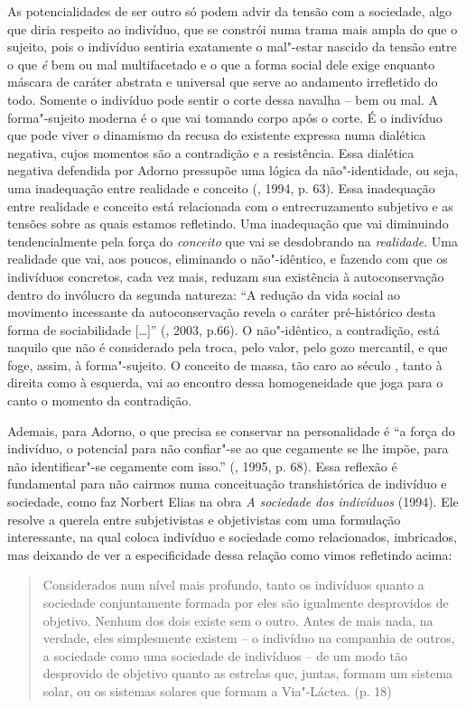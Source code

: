 As potencialidades de ser outro só podem advir da tensão com a
sociedade, algo que diria respeito ao indivíduo, que se constrói numa
trama mais ampla do que o sujeito, pois o indivíduo sentiria exatamente
o mal"-estar nascido da tensão entre o que \emph{é} bem ou mal
multifacetado e o que a forma social dele exige enquanto máscara de
caráter abstrata e universal que serve ao andamento irrefletido do todo.
Somente o indivíduo pode sentir o corte dessa navalha -- bem ou mal. A
forma"-sujeito moderna é o que vai tomando corpo após o corte. É o
indivíduo que pode viver o dinamismo da recusa do existente expressa
numa dialética negativa, cujos momentos são a contradição e a
resistência. Essa dialética negativa defendida por Adorno pressupõe uma
lógica da não"-identidade, ou seja, uma inadequação entre realidade e
conceito (, 1994, p. 63). Essa inadequação entre realidade e
conceito está relacionada com o entrecruzamento subjetivo e as tensões
sobre as quais estamos refletindo. Uma inadequação que vai diminuindo
tendencialmente pela força do \emph{conceito} que vai se desdobrando na
\emph{realidade}. Uma realidade que vai, aos poucos, eliminando o
não"-idêntico, e fazendo com que os indivíduos concretos, cada vez mais,
reduzam sua existência à autoconservação dentro do invólucro da segunda
natureza: ``A redução da vida social ao movimento incessante da
autoconservação revela o caráter pré-histórico desta forma de
sociabilidade [\ldots{}]'' (, 2003, p.66). O não"-idêntico, a
contradição, está naquilo que não é considerado pela troca, pelo valor,
pelo gozo mercantil, e que foge, assim, à forma"-sujeito. O conceito de
massa, tão caro ao século , tanto à direita como à esquerda, vai ao
encontro dessa homogeneidade que joga para o canto o momento da
contradição.

Ademais, para Adorno, o que precisa se conservar na personalidade é ``a
força do indivíduo, o potencial para não confiar"-se ao que cegamente se
lhe impõe, para não identificar"-se cegamente com isso.'' (, 1995,
p. 68). Essa reflexão é fundamental para não cairmos numa conceituação
transhistórica de indivíduo e sociedade, como faz Norbert Elias na obra
\emph{A sociedade dos indivíduos} (1994). Ele resolve a querela entre
subjetivistas e objetivistas com uma formulação interessante, na qual
coloca indivíduo e sociedade como relacionados, imbricados, mas deixando
de ver a especificidade dessa relação como vimos refletindo acima:

\begin{quote}
Considerados num nível mais profundo, tanto os indivíduos quanto a
sociedade conjuntamente formada por eles são igualmente desprovidos de
objetivo. Nenhum dos dois existe sem o outro. Antes de mais nada, na
verdade, eles simplesmente existem -- o indivíduo na companhia de
outros, a sociedade como uma sociedade de indivíduos -- de um modo tão
desprovido de objetivo quanto as estrelas que, juntas, formam um sistema
solar, ou os sistemas solares que formam a Via"-Láctea. (p. 18)
\end{quote}

